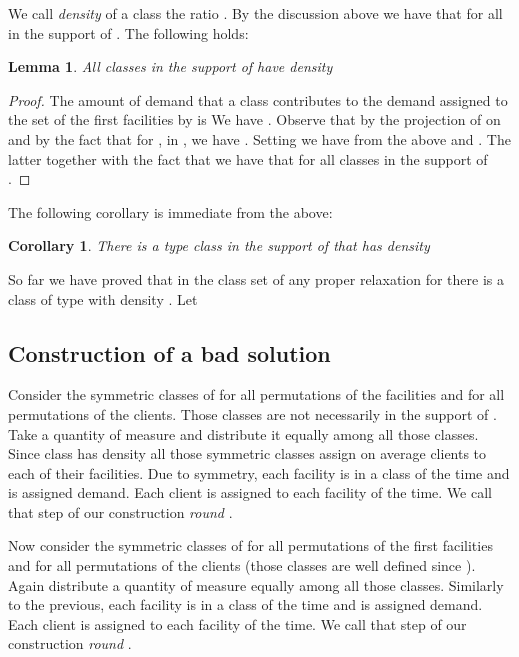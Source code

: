 \documentclass[11pt]{article}\usepackage{amsmath}
\newtheorem{lemma}{Lemma}[section]
\newtheorem{corollary}{Corollary}[section]
\begin{document}
We call \emph{density} of  a class  the ratio 
. By the discussion 
above we have that  for all  in the support of . The following holds:

\begin{lemma}
All classes in the support of  have density 
\end{lemma}

\begin{proof}
The amount of demand that a class  contributes to the demand assigned to the set
of the first  facilities by  is 
 We have .
 Observe
that by the projection of  on  and by the fact that for ,
  in , we have . 
Setting  we have from
the above  and . 
The latter together with the fact that  we have that  for all classes
 in the support of .
\end{proof}

The following corollary is immediate from the above:

\begin{corollary}
There is a type  class in the support of  that has density 
\end{corollary}

So far we have proved that 
in the class set of any proper relaxation for  there is 
a class  of type  with density .
 Let  


\subsection{Construction of a bad solution}

Consider the symmetric classes of  for all permutations of the  facilities
and for all permutations of the clients. Those classes are not necessarily in the support of . Take a quantity of measure  and distribute it equally among all 
those classes. Since class  has density  all those symmetric classes
assign on average  clients to each of their facilities. 
Due to symmetry, each facility is in a class  of the time and is assigned  demand. Each client is assigned to
each facility  of the time. We call that step of our construction \emph{round }.

Now consider the symmetric classes of  for all permutations of the first  facilities
and for all permutations of the clients (those classes are well defined since ).
Again distribute a quantity of measure  equally among all 
those classes. Similarly to the previous, each facility is in a class  of the time and is assigned  demand. Each client is assigned to
each facility  of the time. 
We call that step of our construction \emph{round }.
\end{document}
